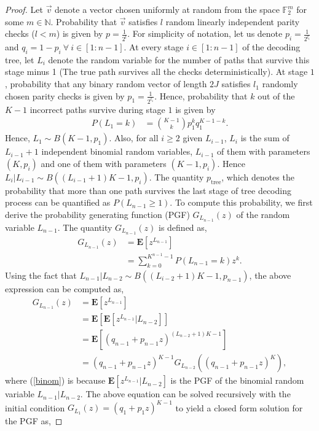 \documentclass{article}
\begin{document}
\begin{proof}
Let $\vec{v}$ denote a vector chosen uniformly at random from the space $\mathbb{F}^m_2$ for some $m \in \mathbb{N}$. Probability that $\vec{v}$ satisfies $l$ random linearly independent parity checks ($l < m$) is given by $p = \frac{1}{2^l}$. For simplicity of notation, let us denote $p_i=\frac{1}{2^{l_i}}$ and $q_i= 1-p_i ~ \forall ~i \in [1:n-1]$. At every stage $i \in [1:n-1]$ of the decoding tree, let $L_i$ denote the random variable for the number of paths that survive this stage minus 1 (The true path survives all the checks deterministically). At stage $1$, probability that any binary random vector of length $2J$ satisfies $l_1$ randomly chosen parity checks is given by $p_1 = \frac{1}{2^{l_1}}$. Hence, probability that $k$ out of the $K-1$ incorrect paths survive during stage $1$ is given by
\begin{align*}
P(L_1 =k) &= {K-1 \choose k}p_1^kq_1^{K-1-k} .
\end{align*}
Hence, $L_1 \sim B(K-1,p_1)$. Also, for all $i \ge 2$ given $L_{i-1}$, $L_i$ is the sum of $L_{i-1}+1$ independent binomial random variables, $L_{i-1}$ of them with parameters $(K,p_i)$ and one of them with parameters $(K-1,p_i)$. Hence $L_i \lvert L_{i-1} \sim B((L_{i-1}+1)K-1,p_i)$. The quantity $p_{\text{tree}}$, which denotes the probability that more than one path survives the last stage of tree  decoding process can be quantified as $P(L_{n-1} \ge 1)$. To compute this probability, we first derive the probability generating function (PGF) $G_{L_{n-1}}(z)$ of the random variable $L_{n-1}$. The quantity $G_{L_{n-1}}(z)$ is defined as,
\begin{align}
G_{L_{n-1}}(z) &= \mathbf{E}[z^{L_{n-1}}] \nonumber \\
&= \sum_{k=0}^{K^{n-1}-1}P(L_{n-1}=k)z^k.   \label{pgfdef}
\end{align}
Using the fact that $L_{n-1} \lvert L_{n-2} \sim B((L_{i-2}+1)K-1,p_{n-1})$, the above expression can be computed as,
\begin{align}
G_{L_{n-1}}(z) &= \mathbf{E}[z^{L_{n-1}}] \nonumber \\
&= \mathbf{E}[\mathbf{E}[z^{L_{n-1}} \lvert L_{n-2}]] \nonumber \\
&= \mathbf{E}[\left(q_{n-1} + p_{n-1}z\right)^{(L_{n-2}+1)K-1}] \label{binom} \\
&= \left(q_{n-1} + p_{n-1}z\right)^{K-1}G_{L_{n-2}}(\left(q_{n-1}+p_{n-1}z\right)^{K}), \nonumber
\end{align}
where (\ref{binom}) is because $\mathbf{E}[z^{L_{n-1}} \lvert L_{n-2}]$ is the PGF of the binomial random variable $L_{n-1} \lvert L_{n-2}$. The above equation can be solved recursively with the initial condition $G_{L_1}(z) = (q_1 + p_1z)^{K-1}$ to yield a closed form solution for the PGF as,

\end{proof}
\end{document}
